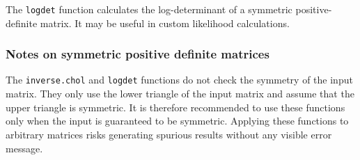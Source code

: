 \documentclass[11pt, a4paper, titlepage]{report}
\begin{document}
The \texttt{logdet} function calculates the log-determinant of a
symmetric positive-definite matrix. It may be useful in custom
likelihood calculations.

\subsubsection{Notes on symmetric positive definite matrices}

The \texttt{inverse.chol} and \texttt{logdet} functions do not check
the symmetry of the input matrix. They only use the lower triangle of
the input matrix and assume that the upper triangle is symmetric. It
is therefore recommended to use these functions only when the input is
guaranteed to be symmetric. Applying these functions to arbitrary
matrices risks generating spurious results without any visible error
message. 
\end{document}
